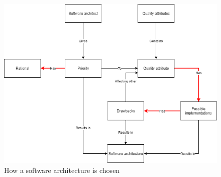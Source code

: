 \begin{figure}[H]
	\includegraphics[width=\linewidth]{creating_architecture.png}
	\caption{How a software architecture is chosen}
\end{figure}
